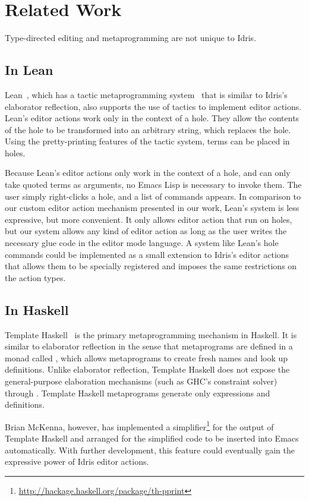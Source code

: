 \section{Related Work} \label{sec:relatedwork}

Type-directed editing and metaprogramming are not unique to Idris.


\subsection{In Lean}

Lean~\cite{lean}, which has a tactic metaprogramming
system~\cite{leanmeta} that is similar to Idris's elaborator
reflection, also supports the use of tactics to implement editor
actions.  Lean's editor actions work only in the context of a
hole. They allow the contents of the hole to be transformed into an
arbitrary string, which replaces the hole. Using the pretty-printing
features of the tactic system, terms can be placed in holes.

Because Lean's editor actions only work in the context of a hole, and
can only take quoted terms as arguments, no Emacs Lisp is necessary to
invoke them. The user simply right-clicks a hole, and a list of
commands appears.  In comparison to our custom editor action mechanism
presented in our work, Lean's system is less expressive, but more
convenient.  It only allows editor action that run on holes, but our
system allows any kind of editor action as long as the user writes the
necessary glue code in the editor mode language.
A system like Lean's hole commands could be implemented as a small
extension to Idris's editor actions that allows them to be specially
registered and imposes the same restrictions on the action types.

\subsection{In Haskell}

Template Haskell~\cite{th} is the primary metaprogramming mechanism in
Haskell.  It is similar to elaborator reflection in the sense that
metaprograms are defined in a monad called , which allows
metaprograms to create fresh names and look up definitions.  Unlike
elaborator reflection, Template Haskell does not expose the
general-purpose elaboration mechanisms (such as GHC's constraint
solver) through .  Template Haskell metaprograms generate only
expressions and definitions.

Brian McKenna, however, has implemented a
simplifier\footnote{\url{http://hackage.haskell.org/package/th-pprint}}
for the output of Template Haskell and arranged for the simplified
code to be inserted into Emacs automatically. With further
development, this feature could eventually gain the expressive power
of Idris editor actions.

